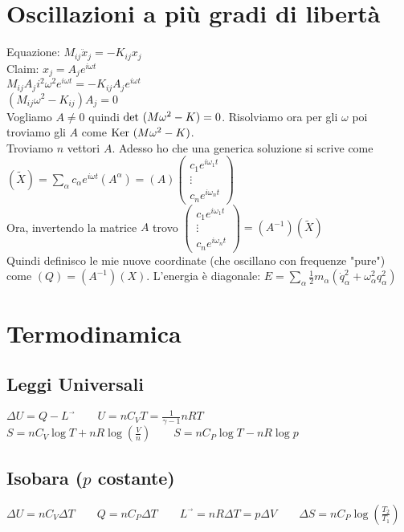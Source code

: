\documentclass[a4paper,NoNotes,GeneralMath,12pt]{stdmdoc}
\begin{document}
	\section*{Oscillazioni a più gradi di libertà}
	Equazione: $M_{ij} \ddot{x}_j = -K_{ij} x_j$ \\
	Claim: $x_j = A_j e^{i\omega t}$ \\
	$M_{ij} A_j i^2 \omega^2 e^{i\omega t} = - K_{ij} A_{j} e^{i\omega t}$ \\
	$\left(M_{ij} \omega^2 - K_{ij} \right) A_j = 0$ \\
	Vogliamo $A \neq 0$ quindi $\mbox{det } (M\omega^2 - K) = 0$. Risolviamo ora per gli $\omega$ poi troviamo gli $A$ come $\mbox{Ker } (M\omega^2 - K )$. \\
	Troviamo $n$ vettori $A$. Adesso ho che una generica soluzione si scrive come $\left(\tilde{X}\right) = \sum_\alpha c_\alpha e^{i\omega t} \left( A^\alpha \right) = \left( A \right) \left( \begin{array}{c} c_1 e^{i\omega_1 t} \\ \vdots \\ c_n e^{i\omega_n t} \end{array} \right)$ \\
	Ora, invertendo la matrice $A$ trovo $\left( \begin{array}{c} c_1 e^{i\omega_1 t} \\ \vdots \\ c_n e^{i\omega_n t} \end{array} \right) = \left( A^{-1} \right) \left( \tilde{X} \right)$ \\
	Quindi definisco le mie nuove coordinate (che oscillano con frequenze "pure") come $\left( Q \right) = \left( A^{-1} \right) \left( X \right)$. L'energia è diagonale: $E = \sum_\alpha \frac{1}{2} m_\alpha ({\dot{q}_\alpha^2} + \omega_\alpha^2 q_\alpha^2 )$

	\section*{Termodinamica}
	\subsection*{Leggi Universali}
	$\Delta U = Q - L^{\vec{}} \qquad U = n C_V T = \frac{1}{\gamma -1} nRT$ \\ $S = nC_V \log T + n R \log \left( \frac{V}{n} \right) \qquad S = n C_P \log T - n R \log p$

	\subsection*{Isobara ($p$ costante)}
	$\Delta U = n C_V \Delta T \qquad Q = n C_P \Delta T \qquad L^{\vec{}} = nR \Delta T = p \Delta V \qquad \Delta S = n C_P \log \left( \frac{T_2}{T_1} \right)$
	
\end{document}
